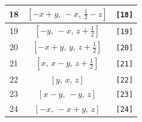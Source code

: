 \documentclass[fleqn,8pt]{jsarticle}
\begin{document}
\begin{longtable}{ccc}
18 & $\left[ - x + y,\, - x,\, \frac{1}{2} - z \right]$ & {\tt [18]} \\ \hline
19 & $\left[ - y,\, - x,\, z + \frac{1}{2} \right]$ & {\tt [19]} \\ \hline
20 & $\left[ - x + y,\, y,\, z + \frac{1}{2} \right]$ & {\tt [20]} \\ \hline
21 & $\left[ x,\, x - y,\, z + \frac{1}{2} \right]$ & {\tt [21]} \\ \hline
22 & $\left[ y,\, x,\, z \right]$ & {\tt [22]} \\ \hline
23 & $\left[ x - y,\, - y,\, z \right]$ & {\tt [23]} \\ \hline
24 & $\left[ - x,\, - x + y,\, z \right]$ & {\tt [24]} \\
\end{longtable}
\end{document}
